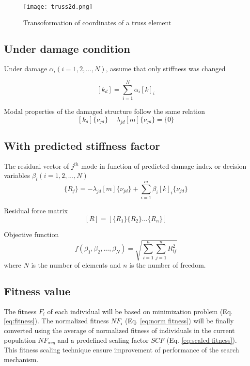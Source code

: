 \begin{figure}[h]
\centering
\texttt{[image: truss2d.png]}
\caption{Transoformation of coordinates of a truss element}
\end{figure}


\subsection*{Under damage condition}

Under damage $\alpha_i (i = 1, 2, ..., N)$, assume that only stiffness was changed

\begin{equation}
\label{eq:stiffness damaged}
[k_d] = \sum_{i=1}^N{\alpha_i[k]_i}
\end{equation}

Modal properties of the damaged structure follow the same relation
\begin{equation}
\label{eq:modal properties damaged}
[k_d]\{\nu_{jd}\}-\lambda_{jd}[m]\{\nu_{jd}\} = \{0\}
\end{equation}

\subsection*{With predicted stiffness factor}
The residual vector of $j^{th}$ mode in function of predicted damage index or decision variables $\beta_i (i= 1, 2, ..., N)$
\begin{equation}
\label{eq:residual force vector}
\{R_j\} = -\lambda_{jd}[m]\{\nu_{jd}\} +  \sum_{i=1}^m{\beta_i[k]_i}\{\nu_{jd}\}
\end{equation}

Residual force matrix
\begin{equation}
\label{eq:residual force matrix}
[R] = [\{R_1\} \{R_2\}... \{R_n\}]
\end{equation}

Objective function
\begin{equation}
f(\beta_1, \beta_2, ..., \beta_N) = \sqrt{\sum_{i=1}^{n}{\sum_{j=1}^{n}{R_{ij}^2}}}
\end{equation}
where $N$ is the number of elements and $n$ is the number of freedom.

\subsection*{Fitness value}
The fitness $F_i$ of each individual will be based on minimization problem (Eq. \ref{eq:fitness}). The normalized fitness $NF_i$ (Eq. \ref{eq:norm fitness}) will be finally converted using the average of normalized fitness of individuals in the current population $NF_{avg}$ and a predefined scaling factor $SCF$ (Eq. \ref{eq:scaled fitness}). This fitness scaling technique \cite{goldberg1989} ensure improvement of performance of the search mechanism.

